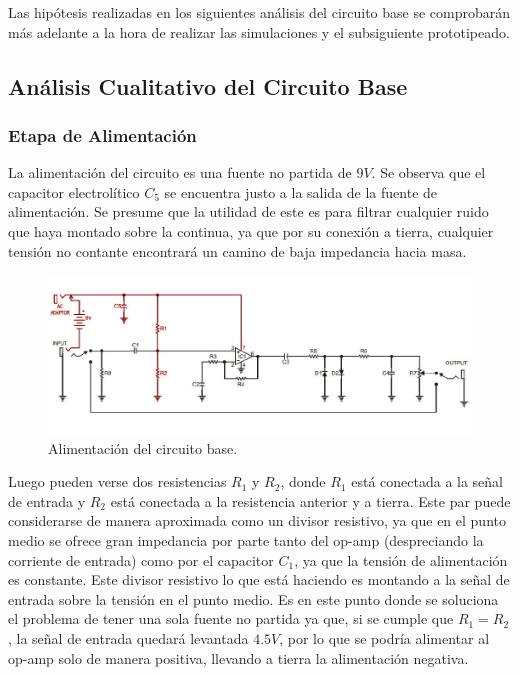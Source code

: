 



Las hipótesis realizadas en los siguientes análisis del circuito base se comprobarán más adelante a la hora de realizar las simulaciones y el subsiguiente prototipeado.

\subsection{Análisis Cualitativo del Circuito Base}

\subsubsection{Etapa de Alimentación}

La alimentación del circuito es una fuente no partida de $9V$. Se observa que el capacitor electrolítico $C_5$ se encuentra justo a la salida de la fuente de alimentación. Se presume que la utilidad de este es para filtrar cualquier ruido que haya montado sobre la continua, ya que por su conexión a tierra, cualquier tensión no contante encontrará un camino de baja impedancia hacia masa.

\begin{figure}[H]
	\centering
	\includegraphics[width=1\textwidth, trim={0 0 0 0}, clip]{Ejercicio5/Imagenes/Circuito_base/circuito_base_alimentacion.png}
	\caption{Alimentación del circuito base.}
	\label{fig:circuito_base_alimentacion}
\end{figure}

Luego pueden verse dos resistencias $R_1$ y $R_2$, donde $R_1$ está conectada a la señal de entrada y $R_2$ está conectada a la resistencia anterior y a tierra. Este par puede considerarse de manera aproximada como un divisor resistivo, ya que en el punto medio se ofrece gran impedancia por parte tanto del op-amp (despreciando la corriente de entrada) como por el capacitor $C_1$, ya que la tensión de alimentación es constante.
Este divisor resistivo lo que está haciendo es montando a la señal de entrada sobre la tensión en el punto medio. Es en este punto donde se soluciona el problema de tener una sola fuente no partida ya que, si se cumple que $R_1=R_2$, la señal de entrada quedará levantada $4.5V$, por lo que se podría alimentar al op-amp solo de manera positiva, llevando a tierra la alimentación negativa.\\

